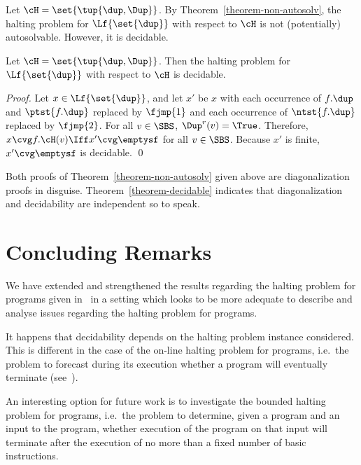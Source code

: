 \documentclass[fleqn]{llncs}
\begin{document}
Let $\cH = \set{\tup{\dup,\Dup}}$.
By Theorem~\ref{theorem-non-autosolv}, the halting problem for
$\Lf{\set{\dup}}$ with respect to $\cH$ is not (potentially)
autosolvable.
However, it is decidable.
\begin{theorem}
\label{theorem-decidable}
Let $\cH = \set{\tup{\dup,\Dup}}$.
Then the halting problem for $\Lf{\set{\dup}}$ with respect to $\cH$ is
decidable.
\end{theorem}
\begin{proof}
Let $x \in \Lf{\set{\dup}}$, and let $x'$ be $x$ with each occurrence of
$f.\dup$ and $\ptst{f.\dup}$ replaced by $\fjmp{1}$ and each occurrence
of $\ntst{f.\dup}$ replaced by $\fjmp{2}$.
For all $v \in \SBS$, $\Dup^r(v) = \True$.
Therefore, $x \cvg f.\cH(v) \Iff x' \cvg \emptysf$ for all $v \in \SBS$.
Because $x'$ is finite, $x' \cvg \emptysf$ is decidable.
\qed
\end{proof}
Both proofs of Theorem~\ref{theorem-non-autosolv} given above are
diagonalization proofs in disguise.
Theorem~\ref{theorem-decidable} indicates that diagonalization and
decidability are independent so to speak.


\section{Concluding Remarks}
\label{sect-concl}

We have extended and strengthened the results regarding the halting
problem for programs given in~\cite{BP04a} in a setting which looks to
be more adequate to describe and analyse issues regarding the halting
problem for programs.

It happens that decidability depends on the halting problem instance
considered.
This is different in the case of the on-line halting problem for
programs, i.e.\ the problem to forecast during its execution whether a
program will eventually terminate (see~\cite{BP04a}).

An interesting option for future work is to investigate the bounded
halting problem for programs, i.e.\ the problem to determine, given a
program and an input to the program, whether execution of the program on
that input will terminate after the execution of no more than a fixed
number of basic instructions.



\end{document}
